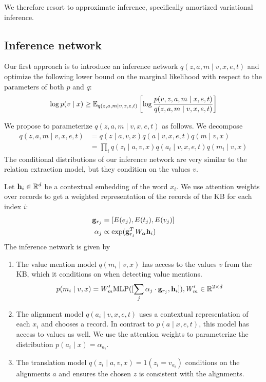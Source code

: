 \documentclass[12pt]{article}
\begin{document}
We therefore resort to approximate inference,
specifically amortized variational inference.

\subsection{Inference network}
Our first approach is to introduce an inference network $q(z,a,m\mid v,x,e,t)$
and optimize the following lower bound on the marginal likelihood
with respect to the parameters of both $p$ and $q$:
\begin{equation}
\label{eqn:lowerbound}
\log p(v\mid x) \geq
\mathbb{E}_{q(z,a,m\mid v,x,e,t)}\left[\log \frac{p(v,z,a,m\mid x,e,t)}{q(z,a,m\mid v,x,e,t)}\right]
\end{equation}

We propose to parameterize $q(z,a,m\mid v,x,e,t)$ as follows.
We decompose 
\begin{equation}
\begin{aligned}
q(z,a,m\mid v,x,e,t) &= q(z \mid a,v,x)q(a\mid v,x,e,t)q(m \mid v,x)\\
&= \prod_i q(z_i \mid a,v,x)q(a_i \mid v,x,e,t)q(m_i \mid v,x)
\end{aligned}
\end{equation}
The conditional distributions of our inference network
are very similar to the relation extraction model,
but they condition on the values $v$.

Let $\mathbf{h}_i \in \mathbb{R}^d$ be a contextual embedding of the word $x_i$.
We use attention weights over records to get a weighted representation
of the records of the KB for each index $i$:
\begin{align*}
\mathbf{g}_{r_j} &= [E(e_j), E(t_j), E(v_j)]\\
\alpha_j &\propto \exp(\mathbf{g}_{r_j}^T W_\alpha \mathbf{h}_i)
\end{align*}
The inference network is given by
\begin{enumerate}
\item The value mention model $q(m_i \mid v,x)$ 
    has access to the values $v$ from the KB, which it conditions on
    when detecting value mentions. 
    $$p(m_i \mid v,x) = W_m' \textrm{MLP}([\sum_j \alpha_j \cdot \mathbf{g}_{r_j}, \mathbf{h}_i]), W'_m \in \mathbb{R}^{2 \times d}$$
\item The alignment model $q(a_i \mid v,x,e,t)$
    uses a contextual representation of each $x_i$ and chooses a record.
    In contrast to $p(a\mid x,e,t)$, this model has access to values as well.
    We use the attention weights to parameterize the distribution
    $p(a_i \mid x) = \alpha_{a_i}$.
\item The translation model $q(z_i \mid a,v,x) = 1(z_i = v_{a_i})$
    conditions on the alignments $a$ and ensures the chosen $z$ is consistent
    with the alignments. 
\end{enumerate}
\end{document}
